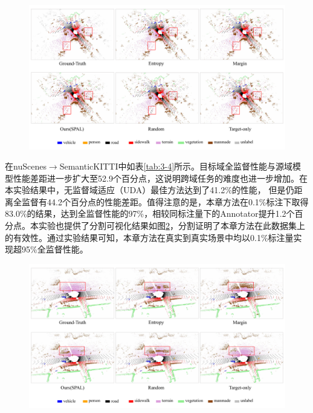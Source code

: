 \vspace{-0.1cm}
\begin{figure}[h]
    \centering
    \includegraphics[width = \textwidth]{ljx/figure/3_vision_k2n.pdf}
    \label{fig:3-v-3}
\end{figure}
\vspace{-0.35cm}
在nuScenes$\to$SemanticKITTI中如表\ref{tab:3-4}所示。目标域全监督性能与源域模型性能差距进一步扩大至52.9个百分点，这说明跨域任务的难度也进一步增加。在本实验结果中，无监督域适应（UDA）最佳方法达到了41.2\%的性能，
但是仍距离全监督有44.2个百分点的性能差距。值得注意的是，本章方法在0.1\%标注下取得83.0\%的结果，达到全监督性能的97\%，相较同标注量下的Annotator提升1.2个百分点。本实验也提供了分割可视化结果如图\ref{fig:3-v-4}，分割证明了本章方法在此数据集上的有效性。通过实验结果可知，本章方法在真实到真实场景中均以0.1\%标注量实现超95\%全监督性能。

\vspace{-0.5cm}
\begin{figure}[H]%
    \centering
    \includegraphics[width = \textwidth]{ljx/figure/3_vision_n2k.pdf}
    \label{fig:3-v-4}
\end{figure}
